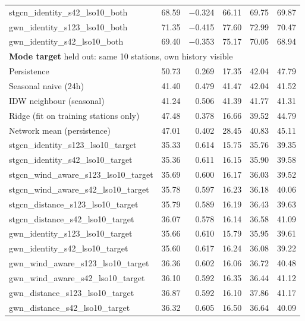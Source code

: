 \documentclass[11pt,a4paper]{article}
\begin{document}
\begin{table}[htbp]
{\begin{tabular}{lrrrrr}
stgcn\_identity\_s42\_lso10\_both    & 68.59 &$-$0.324 & 66.11 & 69.75 & 69.87 \\
gwn\_identity\_s123\_lso10\_both     & 71.35 &$-$0.415 & 77.60 & 72.99 & 70.47 \\
gwn\_identity\_s42\_lso10\_both      & 69.40 &$-$0.353 & 75.17 & 70.05 & 68.94 \\
\midrule
\multicolumn{6}{l}{\textbf{Mode target} \textemdash{} \small held out: same 10 stations, own history visible} \\
Persistence                          & 50.73 & 0.269 & 17.35 & 42.04 & 47.79 \\
Seasonal naive (24h)                 & 41.40 & 0.479 & 41.47 & 42.04 & 41.52 \\
IDW neighbour (seasonal)             & 41.24 & 0.506 & 41.39 & 41.77 & 41.31 \\
Ridge (fit on training stations only)& 47.48 & 0.378 & 16.66 & 39.52 & 44.79 \\
Network mean (persistence)           & 47.01 & 0.402 & 28.45 & 40.83 & 45.11 \\
stgcn\_identity\_s123\_lso10\_target & 35.33 & 0.614 & 15.75 & 35.76 & 39.35 \\
stgcn\_identity\_s42\_lso10\_target  & 35.36 & 0.611 & 16.15 & 35.90 & 39.58 \\
stgcn\_wind\_aware\_s123\_lso10\_target & 35.69 & 0.600 & 16.17 & 36.03 & 39.52 \\
stgcn\_wind\_aware\_s42\_lso10\_target  & 35.78 & 0.597 & 16.23 & 36.18 & 40.06 \\
stgcn\_distance\_s123\_lso10\_target & 35.79 & 0.589 & 16.19 & 36.43 & 39.63 \\
stgcn\_distance\_s42\_lso10\_target  & 36.07 & 0.578 & 16.14 & 36.58 & 41.09 \\
gwn\_identity\_s123\_lso10\_target   & 35.66 & 0.610 & 15.79 & 35.95 & 39.61 \\
gwn\_identity\_s42\_lso10\_target    & 35.60 & 0.617 & 16.24 & 36.08 & 39.22 \\
gwn\_wind\_aware\_s123\_lso10\_target& 36.36 & 0.602 & 16.06 & 36.72 & 40.48 \\
gwn\_wind\_aware\_s42\_lso10\_target & 36.10 & 0.592 & 16.35 & 36.44 & 41.12 \\
gwn\_distance\_s123\_lso10\_target   & 36.87 & 0.592 & 16.10 & 37.86 & 41.17 \\
gwn\_distance\_s42\_lso10\_target    & 36.32 & 0.605 & 16.50 & 36.64 & 40.09 \\
\bottomrule
\end{tabular}%
}
\end{table}
\end{document}
